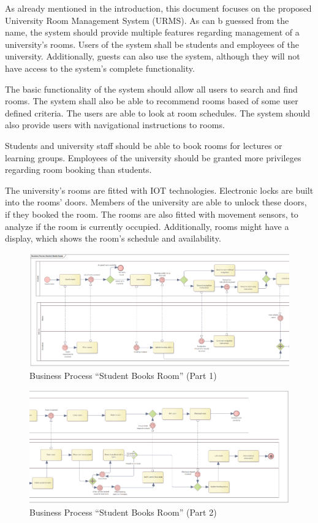 \documentclass[conference,onecolumn]{IEEEtran}
\begin{document}
As already mentioned in the introduction, this document focuses on the proposed University Room Management System (URMS).
As can b guessed from the name, the system should provide multiple features regarding management of a university's rooms.
Users of the system shall be students and employees of the university. Additionally, guests can also use the system, although they will not have access to the system's complete functionality.

The basic functionality of the system should allow all users to search and find rooms. The system shall also be able to recommend rooms based of some user defined criteria. The users are able to look at room schedules.
The system should also provide users with navigational instructions to rooms.

Students and university staff should be able to book rooms for lectures or learning groups. Employees of the university should be granted more privileges regarding room booking than students.

The university's rooms are fitted with IOT technologies.
Electronic locks are built into the rooms' doors. Members of the university are able to unlock these doors, if they booked the room.
The rooms are also fitted with movement sensors, to analyze if the room is currently occupied.
Additionally, rooms might have a display, which shows the room's schedule and availability.

\begin{figure}
	\includegraphics[width=\linewidth]{Figures/BPMN_StudentBooksRoom_1.png}
	\caption{Business Process ``Student Books Room'' (Part 1)}
	\label{fig:bpmn_1}
\end{figure}

\begin{figure}
	\includegraphics[width=\linewidth]{Figures/BPMN_StudentBooksRoom_2.png}
	\caption{Business Process ``Student Books Room'' (Part 2)}
	\label{fig:bpmn_2}
\end{figure}
\end{document}
